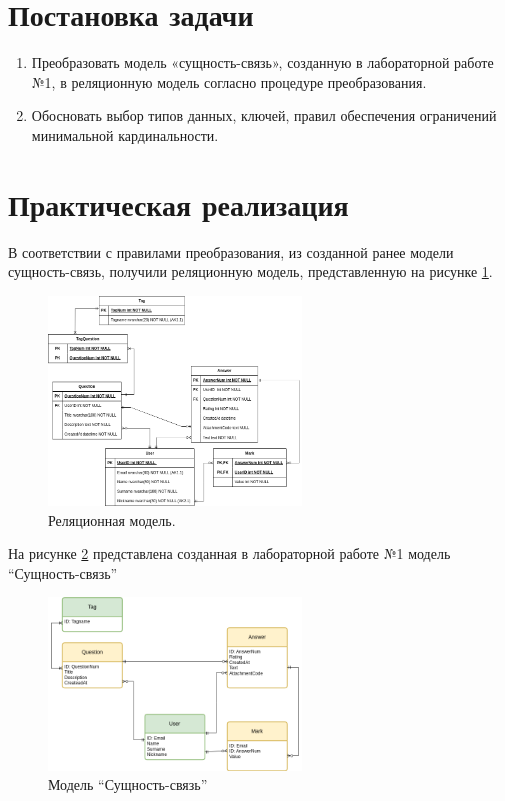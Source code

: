 \documentclass[a4paper, 14pt]{extarticle}
\begin{document}
\newpage




\section{Постановка задачи}

\begin{enumerate}
	\item{Преобразовать модель «сущность-связь», созданную в лабораторной работе №1, в реляционную модель согласно процедуре преобразования.} 
	\item{Обосновать выбор типов данных, ключей, правил обеспечения ограничений минимальной кардинальности.}
\end{enumerate}

\newpage

\section{Практическая реализация}

В соответствии с правилами преобразования, из созданной ранее модели сущность-связь, получили реляционную модель, представленную на  рисунке \ref{fig:relation_model}.

\begin{figure}[ht]
\centering
\includegraphics[width=0.6\textwidth]{Diagram2}
\caption{Реляционная модель.} 
\label{fig:relation_model}
\end{figure}

На рисунке \ref{fig:er_model} представлена созданная в лабораторной работе №1 модель “Сущность-связь”

\begin{figure}[ht]
\centering
\includegraphics[width=0.6\textwidth]{Diagram1} 
\caption{Модель “Сущность-связь”} 
\label{fig:er_model}
\end{figure}
\end{document}
